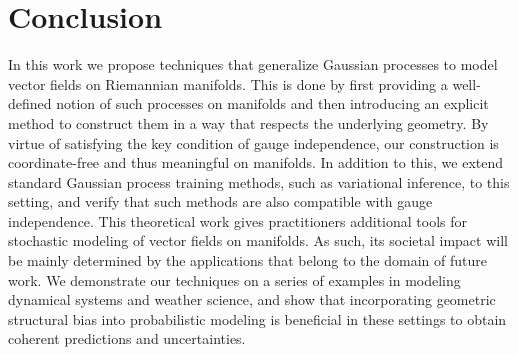 \section{Conclusion}
In this work we propose techniques that generalize Gaussian processes to model vector fields on Riemannian manifolds.
This is done by first providing a well-defined notion of such processes on manifolds and then introducing an explicit method to construct them in a way that respects the underlying geometry.
By virtue of satisfying the key condition of gauge independence, our construction is coordinate-free and thus meaningful on manifolds.
In addition to this, we extend standard Gaussian process training methods, such as variational inference, to this setting, and verify that such methods are also compatible with gauge independence.
This theoretical work gives practitioners additional tools for stochastic modeling of vector fields on manifolds.
As such, its societal impact will be mainly determined by the applications that belong to the domain of future work.
We demonstrate our techniques on a series of examples in modeling dynamical systems and weather science, and show that incorporating geometric structural bias into probabilistic modeling is beneficial in these settings to obtain coherent predictions and uncertainties.
